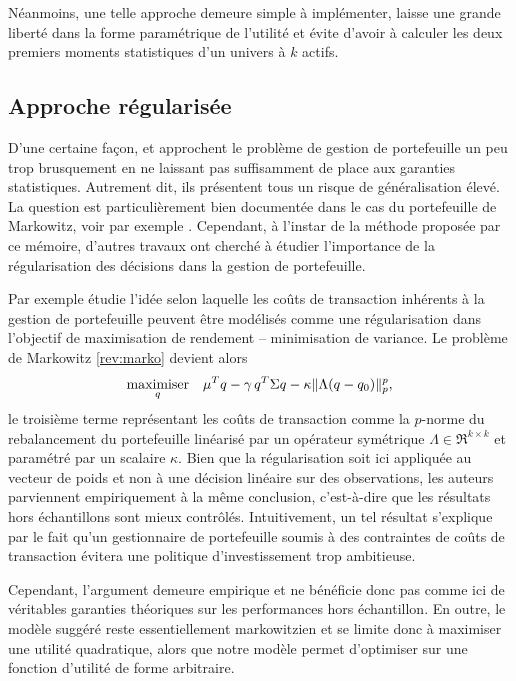 Néanmoins, une telle approche demeure simple à implémenter, laisse une grande liberté dans
la forme paramétrique de l'utilité et évite d'avoir à calculer les deux premiers moments
statistiques d'un univers à $k$ actifs.

\subsection{Approche régularisée}

D'une certaine façon, \cite{markowitz1952portfolio} et \cite{brandt2009parametric}
approchent le problème de gestion de portefeuille un peu trop brusquement en ne laissant
pas suffisamment de place aux garanties statistiques. Autrement dit, ils présentent tous
un risque de généralisation élevé. La question est particulièrement bien documentée dans
le cas du portefeuille de Markowitz, voir par exemple
\cite{michaud1989markowitz}. Cependant, à l'instar de la méthode proposée par ce mémoire,
d'autres travaux ont cherché à étudier l'importance de la régularisation des décisions
dans la gestion de portefeuille.

Par exemple \cite{olivares2015robust} étudie l'idée selon laquelle les coûts de
transaction inhérents à la gestion de portefeuille peuvent être modélisés comme une
régularisation dans l'objectif de maximisation de rendement -- minimisation de variance. Le
problème de Markowitz \eqref{rev:marko} devient alors
\begin{equation}
  \maximizeEquation[q]{\mu^Tq - \gamma\,q^T\Sigma q - \kappa\|\Lambda(q-q_0)\|_p^p,}
\end{equation}
le troisième terme représentant les coûts de transaction comme la $p$-norme du
rebalancement du portefeuille linéarisé par un opérateur symétrique
$\Lambda \in \Re^{k \times k}$ et paramétré par un scalaire $\kappa$. Bien que la régularisation soit ici
appliquée au vecteur de poids et non à une décision linéaire sur des observations, les
auteurs parviennent empiriquement à la même conclusion, c'est-à-dire que les résultats
hors échantillons sont mieux contrôlés. Intuitivement, un tel résultat s'explique par le
fait qu'un gestionnaire de portefeuille soumis à des contraintes de coûts de transaction
évitera une politique d'investissement trop ambitieuse.

Cependant, l'argument demeure empirique et ne bénéficie donc pas comme ici de véritables
garanties théoriques sur les performances hors échantillon. En outre, le modèle suggéré
reste essentiellement markowitzien et se limite donc à maximiser une utilité quadratique,
alors que notre modèle permet d'optimiser sur une fonction d'utilité de forme arbitraire.

